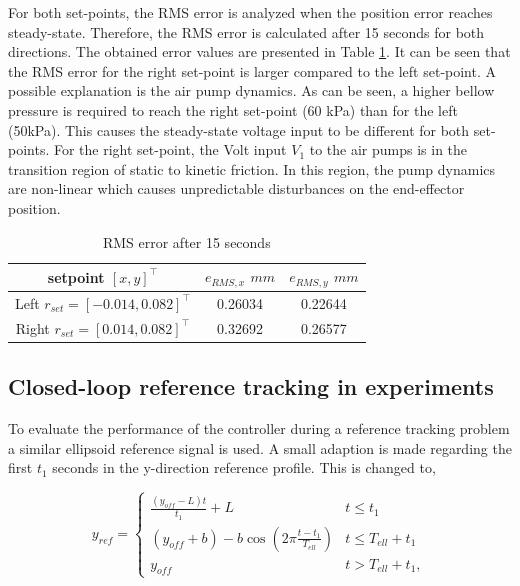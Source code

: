 For both set-points, the RMS error is analyzed when the position error reaches steady-state. Therefore, the RMS error is calculated after 15 seconds for both directions. The obtained error values are presented in Table \ref{tab:RMSerrors}. It can be seen that the RMS error for the right set-point is larger compared to the left set-point. A possible explanation is the air pump dynamics. As can be seen, a higher bellow pressure is required to reach the right set-point (60 kPa) than for the left (50kPa). This causes the steady-state voltage input to be different for both set-points. For the right set-point, the Volt input $V_1$ to the air pumps is in the transition region of static to kinetic friction. In this region, the pump dynamics are non-linear which causes unpredictable disturbances on the end-effector position. 





\begin{table}[H]
    \centering
    \caption{RMS error after 15 seconds}
    \begin{tabular}{|c|c|c|} \hline
     setpoint $[x,y]^\top$    & $e_{RMS,x}$ $mm$  &  $e_{RMS,y}$ $mm$  \\ \hline
    Left $r_{set}= [-0.014,0.082]^\top$     & 0.26034  & 0.22644 \\ \hline
    Right $r_{set}= [0.014,0.082]^\top$  &  0.32692&   0.26577\\ \hline
    \end{tabular}
    \label{tab:RMSerrors}
\end{table}



\subsection*{Closed-loop reference tracking in experiments}

To evaluate the performance of the controller during a reference tracking problem a similar ellipsoid reference signal is used. A small adaption is made regarding the first $t_1$ seconds in the y-direction reference profile. This is changed to,


\begin{equation}
    y_{ref} = \begin{cases} 
      \frac{(y_{off} - L) t}{t_1} + L&  t \leq t_1 \\
     (y_{off} +b) -  b \cos(2\pi \frac{t - t_1}{T_{ell}}) & t \leq T_{ell} + t_1 \\
     y_{off} & t > T_{ell} + t_1,
   \end{cases} 
\end{equation}

